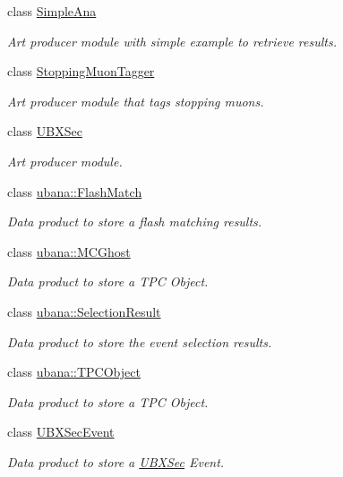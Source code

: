 \begin{DoxyCompactItemize}
class \hyperlink{classSimpleAna}{Simple\-Ana}
\begin{DoxyCompactList}\small\item\em Art producer module with simple example to retrieve results. \end{DoxyCompactList}\item 
class \hyperlink{classStoppingMuonTagger}{Stopping\-Muon\-Tagger}
\begin{DoxyCompactList}\small\item\em Art producer module that tags stopping muons. \end{DoxyCompactList}\item 
class \hyperlink{classUBXSec}{U\-B\-X\-Sec}
\begin{DoxyCompactList}\small\item\em Art producer module. \end{DoxyCompactList}\item 
class \hyperlink{classubana_1_1FlashMatch}{ubana\-::\-Flash\-Match}
\begin{DoxyCompactList}\small\item\em Data product to store a flash matching results. \end{DoxyCompactList}\item 
class \hyperlink{classubana_1_1MCGhost}{ubana\-::\-M\-C\-Ghost}
\begin{DoxyCompactList}\small\item\em Data product to store a T\-P\-C Object. \end{DoxyCompactList}\item 
class \hyperlink{classubana_1_1SelectionResult}{ubana\-::\-Selection\-Result}
\begin{DoxyCompactList}\small\item\em Data product to store the event selection results. \end{DoxyCompactList}\item 
class \hyperlink{classubana_1_1TPCObject}{ubana\-::\-T\-P\-C\-Object}
\begin{DoxyCompactList}\small\item\em Data product to store a T\-P\-C Object. \end{DoxyCompactList}\item 
class \hyperlink{classUBXSecEvent}{U\-B\-X\-Sec\-Event}
\begin{DoxyCompactList}\small\item\em Data product to store a \hyperlink{classUBXSec}{U\-B\-X\-Sec} Event. \end{DoxyCompactList}\item 

\end{DoxyCompactItemize}
